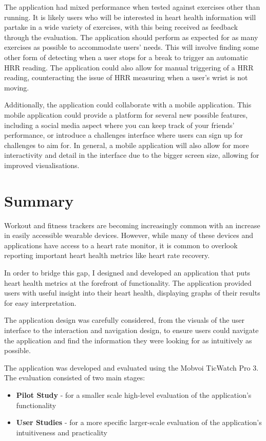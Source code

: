 \documentclass{l4proj}
\begin{document}
The application had mixed performance when tested against exercises other than running. It is likely users who will be interested in heart health information will partake in a wide variety of exercises, with this being received as feedback through the evaluation. The application should perform as expected for as many exercises as possible to accommodate users' needs. This will involve finding some other form of detecting when a user stops for a break to trigger an automatic HRR reading. The application could also allow for manual triggering of a HRR reading, counteracting the issue of HRR measuring when a user’s wrist is not moving.

Additionally, the application could collaborate with a mobile application. This mobile application could provide a platform for several new possible features, including a social media aspect where you can keep track of your friends’ performance, or introduce a challenges interface where users can sign up for challenges to aim for. In general, a mobile application will also allow for more interactivity and detail in the interface due to the bigger screen size, allowing for improved visualisations.

\section{Summary}
\label{sec:summary}

Workout and fitness trackers are becoming increasingly common with an increase in easily accessible wearable devices. However, while many of these devices and applications have access to a heart rate monitor, it is common to overlook reporting important heart health metrics like heart rate recovery.

In order to bridge this gap, I designed and developed an application that puts heart health metrics at the forefront of functionality. The application provided users with useful insight into their heart health, displaying graphs of their results for easy interpretation.

The application design was carefully considered, from the visuals of the user interface to the interaction and navigation design, to ensure users could navigate the application and find the information they were looking for as intuitively as possible.

The application was developed and evaluated using the Mobvoi TicWatch Pro 3. The evaluation consisted of two main stages:

\begin{itemize}
    \item \textbf{Pilot Study} - for a smaller scale high-level evaluation of the application’s functionality
    \item \textbf{User Studies} - for a more specific larger-scale evaluation of the application’s intuitiveness and practicality
\end{itemize}
\end{document}
